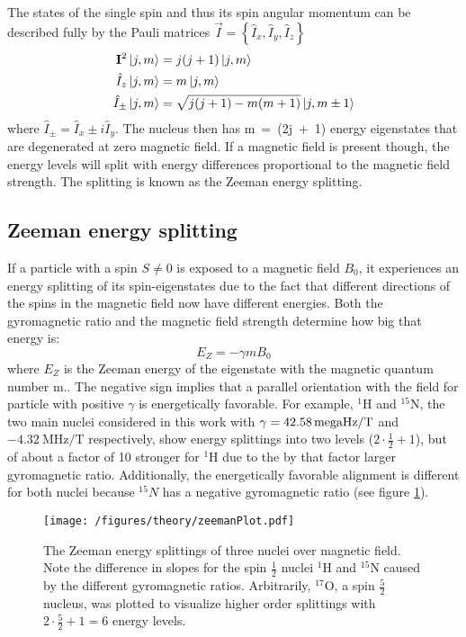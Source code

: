        The states of the single spin and thus its spin angular momentum can be described fully by the Pauli matrices $\vec{I} = \left\{ \hat{I}_x, \hat{I}_y, \hat{I}_z\right\}$\cite{pauli_zur_1988}
            \begin{align}
                \label{equ:theory:spinStates}
                \mathbf{I}^2 \ket{j,m} &= j(j+1)\ket{j,m}\\
                \hat{I}_z \ket{j,m} &= m\ket{j,m}\\
                \hat{I}_\pm \ket{j,m} &= \sqrt{j(j+1)-m(m+1)}\ket{j,m\pm1}
            \end{align}
        where $ \hat{I}_\pm = \hat{I}_x\pm i \hat{I}_y$.
        The nucleus then has m~=~(2j~+~1) energy eigenstates that are degenerated at zero magnetic field. If a magnetic field is present though, the energy levels will split with energy differences proportional to the magnetic field strength. The splitting is known as the Zeeman energy splitting.
        \subsection{Zeeman energy splitting}
            If a particle with a spin $S\neq 0$ is exposed to a magnetic field $B_0$, it experiences an energy splitting of its spin-eigenstates due to the fact that different directions of the spins in the magnetic field now have different energies. Both the gyromagnetic ratio and the magnetic field strength determine how big that energy is:
            \begin{equation}
                E_{Z} = -\gamma m B_0
            \end{equation}
            where $E_Z$ is the Zeeman energy of the eigenstate with the magnetic quantum number m.\cite{gerlach_experimentelle_1989, bloch_nuclear_1946}. The negative sign implies that a parallel orientation with the field for particle with positive $\gamma$ is energetically favorable. For example, $^1$H and $^{15}$N, the two main nuclei considered in this work with $\gamma = \SI{42.58}{\\mega\hertz\per\tesla}$ and $\SI{-4.32}{\mega\hertz\per\tesla}$ respectively, show energy splittings into two levels ($2\cdot\tfrac{1}{2}+1$), but of about a factor of 10 stronger for $^1$H due to the by that factor larger gyromagnetic ratio. Additionally, the energetically favorable alignment is different for both nuclei because $^{15}N$ has a negative gyromagnetic ratio (see figure \ref{figure:theory:zeemanSplittings}).
            \begin{figure}
                \centering
                \texttt{[image: /figures/theory/zeemanPlot.pdf]}
                \caption[Zeeman energy splitting]{The Zeeman energy splittings of three nuclei over magnetic field. Note the difference in slopes for the spin $\tfrac{1}{2}$ nuclei $^1$H and $^{15}$N caused by the different gyromagnetic ratios. Arbitrarily, $^{17}$O, a spin $\tfrac{5}{2}$ nucleus, was plotted to visualize higher order splittings with $2 \cdot\tfrac{5}{2}+1 = 6$ energy levels. }
                \label{figure:theory:zeemanSplittings}
            \end{figure}

